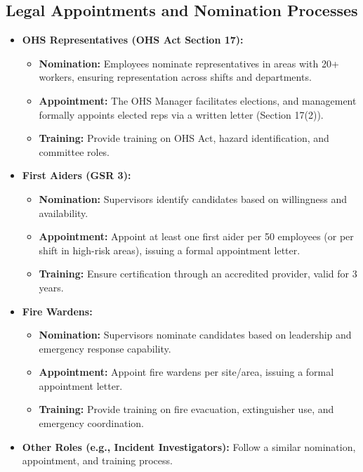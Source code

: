 \documentclass[12pt]{article}
\begin{document}
\subsection{Legal Appointments and Nomination Processes}
\begin{itemize}
    \item \textbf{OHS Representatives (OHS Act Section 17):}
        \begin{itemize}
            \item \textbf{Nomination:} Employees nominate representatives in areas with 20+ workers, ensuring representation across shifts and departments.
            \item \textbf{Appointment:} The OHS Manager facilitates elections, and management formally appoints elected reps via a written letter (Section 17(2)).
            \item \textbf{Training:} Provide training on OHS Act, hazard identification, and committee roles.
        \end{itemize}
    \item \textbf{First Aiders (GSR 3):}
        \begin{itemize}
            \item \textbf{Nomination:} Supervisors identify candidates based on willingness and availability.
            \item \textbf{Appointment:} Appoint at least one first aider per 50 employees (or per shift in high-risk areas), issuing a formal appointment letter.
            \item \textbf{Training:} Ensure certification through an accredited provider, valid for 3 years.
        \end{itemize}
    \item \textbf{Fire Wardens:}
        \begin{itemize}
            \item \textbf{Nomination:} Supervisors nominate candidates based on leadership and emergency response capability.
            \item \textbf{Appointment:} Appoint fire wardens per site/area, issuing a formal appointment letter.
            \item \textbf{Training:} Provide training on fire evacuation, extinguisher use, and emergency coordination.
        \end{itemize}
    \item \textbf{Other Roles (e.g., Incident Investigators):} Follow a similar nomination, appointment, and training process.
\end{itemize}
\end{document}
